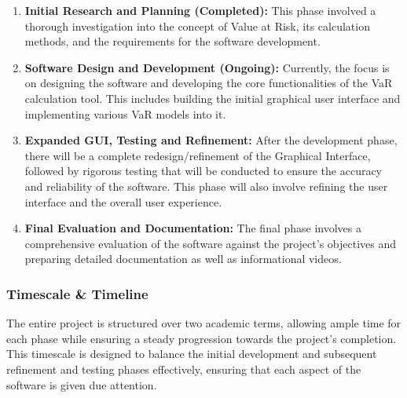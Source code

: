 \documentclass{article}
\begin{document}
  \begin{enumerate}
    \item \textbf{Initial Research and Planning (Completed):} This phase involved a thorough investigation into the concept of Value at Risk, its calculation methods, and the requirements for the software development.
    \item \textbf{Software Design and Development (Ongoing):} Currently, the focus is on designing the software and developing the core functionalities of the VaR calculation tool. This includes building the initial graphical user interface and implementing various VaR models into it.
    \item \textbf{Expanded GUI, Testing and Refinement:} After the development phase, there will be a complete redesign/refinement of the Graphical Interface, followed by rigorous testing that will be conducted to ensure the accuracy and reliability of the software. This phase will also involve refining the user interface and the overall user experience.
    \item \textbf{Final Evaluation and Documentation:} The final phase involves a comprehensive evaluation of the software against the project's objectives and preparing detailed documentation as well as informational videos.
  \end{enumerate}

  \subsubsection{Timescale \& Timeline}
  The entire project is structured over two academic terms, allowing ample time for each phase while ensuring a steady progression towards the project's completion. This timescale is designed to balance the initial development and subsequent refinement and testing phases effectively, ensuring that each aspect of the software is given due attention.\\\vspace{0.3cm}
\end{document}
